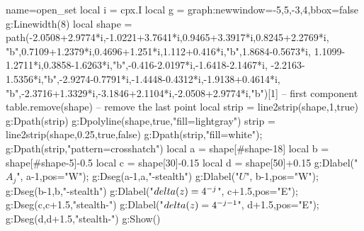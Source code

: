 \documentclass[10pt,border=5pt]{standalone}%
\begin{document}
\begin{luadraw}{name=open_set}
local i = cpx.I
local g = graph:new{window={-5,5,-3,4},bbox=false}
g:Linewidth(8)
local shape = path({-2.0508+2.9774*i,-1.0221+3.7641*i,0.9465+3.3917*i,0.8245+2.2769*i,
"b",0.7109+1.2379*i,0.4696+1.251*i,1.112+0.416*i,"b",1.8684-0.5673*i,
1.1099-1.2711*i,0.3858-1.6263*i,"b",-0.416-2.0197*i,-1.6418-2.1467*i,
-2.2163-1.5356*i,"b",-2.9274-0.7791*i,-1.4448-0.4312*i,-1.9138+0.4614*i,
"b",-2.3716+1.3329*i,-3.1846+2.1104*i,-2.0508+2.9774*i,"b"})[1] -- first component
table.remove(shape) -- remove the last point
local strip = line2strip(shape,1,true)
g:Dpath(strip)
g:Dpolyline(shape,true,"fill=lightgray")
strip = line2strip(shape,0.25,true,false)
g:Dpath(strip,"fill=white"); g:Dpath(strip,"pattern=crosshatch") 
local a = shape[#shape-18]
local b = shape[#shape-5]-0.5
local c = shape[30]-0.15
local d = shape[50]+0.15
g:Dlabel("$A_j$", a-1,{pos="W"}); g:Dseg({a-1,a},"-stealth")
g:Dlabel("$U$", b-1,{pos="W"}); g:Dseg({b-1,b},"-stealth")
g:Dlabel("$\\delta(z)=4^{-j}$", c+1.5,{pos="E"}); g:Dseg({c,c+1.5},"stealth-")
g:Dlabel("$\\delta(z)=4^{-j-1}$", d+1.5,{pos="E"}); g:Dseg({d,d+1.5},"stealth-")
g:Show()
\end{luadraw}
\end{document}
